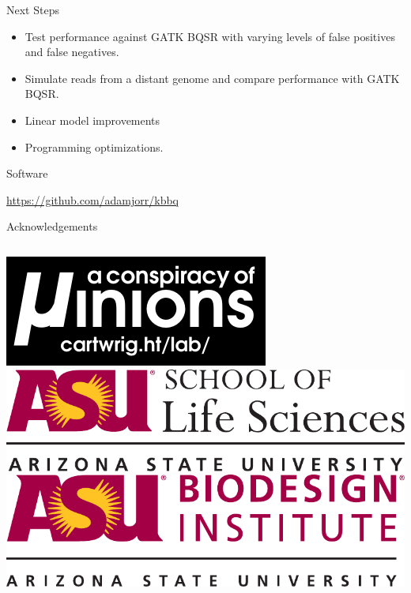 \documentclass{beamer}
\begin{document}
\begin{frame}{}
\begin{columns}[T]
\begin{column}[T]{.5\linewidth}
\begin{block}{Next Steps}
\begin{itemize}
	\item Test performance against GATK BQSR with varying levels of false positives and false negatives.
	\item Simulate reads from a distant genome and compare performance with GATK BQSR.
	\item Linear model improvements
	\item Programming optimizations.
\end{itemize}
\end{block}


\begin{block}{Software}

 \url{https://github.com/adamjorr/kbbq}

\end{block}

\begin{block}{Acknowledgements}


\begin{columns}
\includegraphics[width=\linewidth]{lab_logo.pdf}
\includegraphics[width=\linewidth]{sols_logo.pdf}
\includegraphics[width=\linewidth]{biodesign_logo.pdf}
\end{columns}


\end{block}

\end{column}
\end{columns}
\end{frame}
\end{document}
